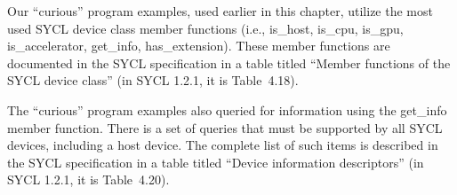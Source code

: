 Our “curious” program examples, used earlier in this chapter, utilize the most used SYCL device class member functions (i.e., is\_host, is\_cpu, is\_gpu, is\_accelerator, get\_info, has\_extension). These member functions are documented in the SYCL specification in a table titled “Member functions of the SYCL device class” (in SYCL 1.2.1, it is Table 4.18).\par

The “curious” program examples also queried for information using the get\_info member function. There is a set of queries that must be supported by all SYCL devices, including a host device. The complete list of such items is described in the SYCL specification in a table titled “Device information descriptors” (in SYCL 1.2.1, it is Table 4.20).\par